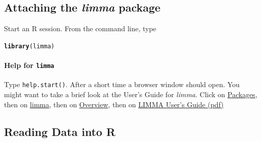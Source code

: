 \documentclass[a4paper,9pt]{article}\usepackage[]{graphicx}\usepackage[]{color}
\makeatletter
\newcommand{\hlstd}[1]{\textcolor[rgb]{0.345,0.345,0.345}{#1}}%
\newcommand{\hlkwd}[1]{\textcolor[rgb]{0.737,0.353,0.396}{\textbf{#1}}}%
\newenvironment{kframe}{%
 \def\at@end@of@kframe{}%
 \ifinner\ifhmode%
  \def\at@end@of@kframe{\end{minipage}}%
  \begin{minipage}{\columnwidth}%
 \fi\fi%
 \def\FrameCommand##1{\hskip\@totalleftmargin \hskip-\fboxsep
 \colorbox{shadecolor}{##1}\hskip-\fboxsep
     \hskip-\linewidth \hskip-\@totalleftmargin \hskip\columnwidth}%
 \MakeFramed {\advance\hsize-\width
   \@totalleftmargin\z@ \linewidth\hsize
   \@setminipage}}%
 {\par\unskip\endMakeFramed%
 \at@end@of@kframe}
\newenvironment{knitrout}{}{} %
\makeatother
\begin{document}
\subsection*{Attaching the \textit{limma} package}

Start an R session.  From the command line, type
\begin{knitrout}
\color{fgcolor}\begin{kframe}
\begin{alltt}
\hlkwd{library}\hlstd{(limma)}
\end{alltt}
\end{kframe}
\end{knitrout}

\paragraph{Help for \texttt{limma}}

Type \texttt{help.start()}.  After a short time a browser window should
open.  You might want to take a brief look at the User's Guide for
\textit{limma}.  Click on \underline{Packages}, then on
\underline{limma}, then on \underline{Overview}, then on
\underline{LIMMA User's Guide (pdf)}

\subsection{Reading Data into R}
\end{document}
